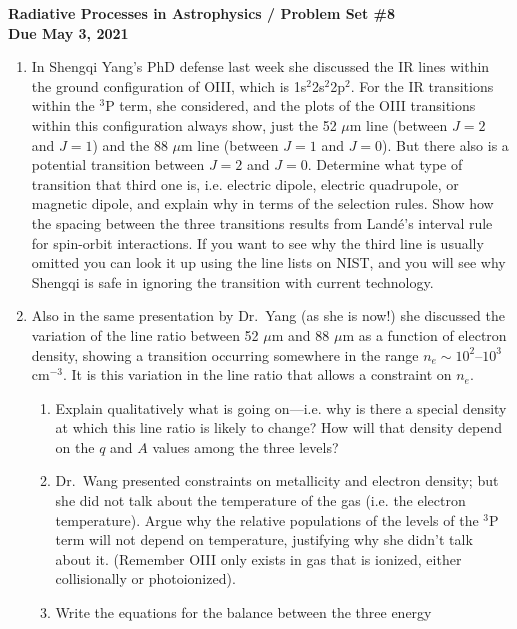 \documentclass[11pt, preprint]{article}
\begin{document}
\begin{center}
  {\bf Radiative Processes in Astrophysics / Problem Set \#8 \\
    Due May 3, 2021}
\end{center}

\begin{enumerate}
\item In Shengqi Yang's PhD defense last week she discussed the IR
  lines within the ground configuration of OIII, which is
  1s$^2$2s$^2$2p$^2$. For the IR transitions within the ${}^3$P term,
  she considered, and the plots of the OIII transitions within this
  configuration always show, just the 52 $\mu$m line (between $J=2$
  and $J=1$) and the 88 $\mu$m line (between $J=1$ and $J=0$). But
  there also is a potential transition between $J=2$ and
  $J=0$. Determine what type of transition that third one is,
  i.e. electric dipole, electric quadrupole, or magnetic dipole, and
  explain why in terms of the selection rules. Show how the spacing
  between the three transitions results from Land\'e's interval rule
  for spin-orbit interactions. If you want to see why the third line
  is usually omitted you can look it up using the line lists on NIST,
  and you will see why Shengqi is safe in ignoring the transition with
  current technology.
\item Also in the same presentation by Dr.~Yang (as she is now!) she
  discussed the variation of the line ratio between 52 $\mu$m and 88
  $\mu$m as a function of electron density, showing a transition
  occurring somewhere in the range $n_e\sim10^2$--$10^3$ cm$^{-3}$. It
  is this variation in the line ratio that allows a constraint on $n_e$.
\begin{enumerate}
  \item Explain qualitatively what is going on---i.e. why is there a
    special density at which this line ratio is likely to change? How
    will that density depend on the $q$ and $A$ values among the three
    levels?
  \item Dr.~Wang presented constraints on metallicity and electron
    density; but she did not talk about the temperature of the gas
    (i.e. the electron temperature).  Argue why the relative
    populations of the levels of the ${}^3$P term will not depend on
    temperature, justifying why she didn't talk about it.  (Remember
    OIII only exists in gas that is ionized, either collisionally or
    photoionized).
  \item Write the equations for the balance between the three energy

\end{enumerate}
\end{enumerate}
\end{document}
